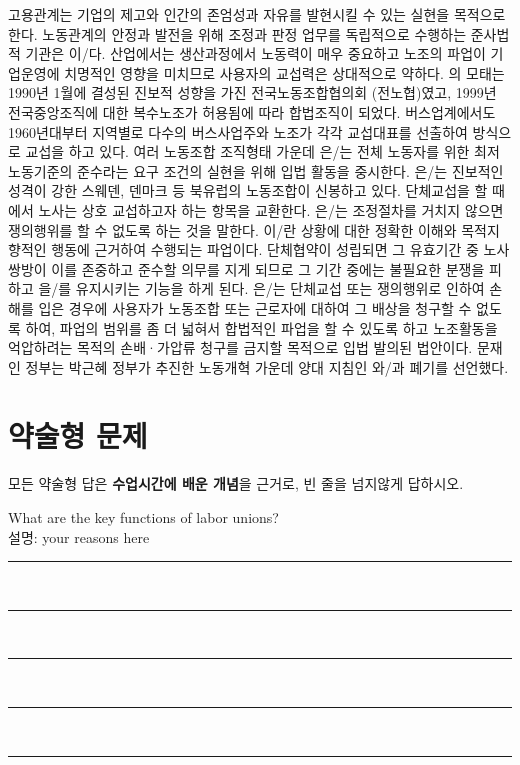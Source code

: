 \documentclass[11pt,answers]{exam} %
\begin{document}
\begin{questions}
\question[2] 고용관계는 기업의 \fillin[효율성]{} 제고와 인간의 존엄성과 자유를 발현시킬 수 있는 \fillin[공정성]{} 실현을 목적으로 한다.
\question[2] 노동관계의 안정과 발전을 위해 조정과 판정 업무를 독립적으로 수행하는 준사법적 기관은 \fillin[노동위원회]{}이/다.
\question[2] \fillin[노동집약적]{} 산업에서는 생산과정에서 노동력이 매우 중요하고 노조의 파업이 기업운영에 치명적인 영향을 미치므로 사용자의 교섭력은 상대적으로 약하다.
\question[2] \fillin[민주노총]{}의 모태는 1990년 1월에 결성된 진보적 성향을 가진 전국노동조합협의회 (전노협)였고, 1999년 전국중앙조직에 대한 복수노조가 허용됨에 따라 합법조직이 되었다.
\question[2] 버스업계에서도 1960년대부터 지역별로 다수의 버스사업주와 노조가 각각 교섭대표를 선출하여 \fillin[집단교섭]{} 방식으로 교섭을 하고 있다.
\question[2] 여러 노동조합 조직형태 가운데 \fillin[일반조합]{}은/는 전체 노동자를 위한 최저 노동기준의 준수라는 요구 조건의 실현을 위해 입법 활동을 중시한다.
\question[2] 은/는 진보적인 성격이 강한 스웨덴, 덴마크 등 북유럽의 노동조합이 신봉하고 있다.
\question[2] 단체교섭을 할 때 \fillin[예비회담]{}에서 노사는 상호 교섭하고자 하는 항목을 교환한다.
\question[2] \fillin[조정전치주의]{}은/는 조정절차를 거치지 않으면 쟁의행위를 할 수 없도록 하는 것을 말한다.
\question[2] \fillin[계산적파업]{} 이/란 상황에 대한 정확한 이해와 목적지향적인 행동에 근거하여 수행되는 파업이다.
\question[2] 단체협약이 성립되면 그 유효기간 중 노사 쌍방이 이를 존중하고 준수할 의무를 지게 되므로 그 기간 중에는 불필요한 분쟁을 피하고 \fillin[산업평화]{}을/를 유지시키는 기능을 하게 된다.
\question[2] \fillin[노란봉투법]{}은/는 단체교섭 또는 쟁의행위로 인하여 손해를 입은 경우에 사용자가 노동조합 또는 근로자에 대하여 그 배상을 청구할 수 없도록 하여, 파업의 범위를 좀 더 넓혀서 합법적인 파업을 할 수 있도록 하고 노조활동을 억압하려는 목적의 손배·가압류 청구를 금지할 목적으로 입법 발의된 법안이다.
\question[2] 문재인 정부는 박근혜 정부가 추진한 노동개혁 가운데 양대 지침인 \fillin[일반해고]{}와/과 \fillin[취업규칙 변경·완화]{} 폐기를 선언했다.


\section*{약술형 문제}
모든 약술형 답은 \textbf{수업시간에 배운 개념}을 근거로, 빈 줄을 넘지않게 답하시오.

\question[10] What are the key functions of labor unions? \\[3pt]
\ifprintanswers\relax
    설명: your reasons here
\else
    \rule{\linewidth}{0.4pt} \\[3pt]
    \rule{\linewidth}{0.4pt} \\[3pt]
    \rule{\linewidth}{0.4pt} \\[3pt]
    \rule{\linewidth}{0.4pt} \\[3pt]
    \rule{\linewidth}{0.4pt}
\fi

\end{questions}

\end{document}
